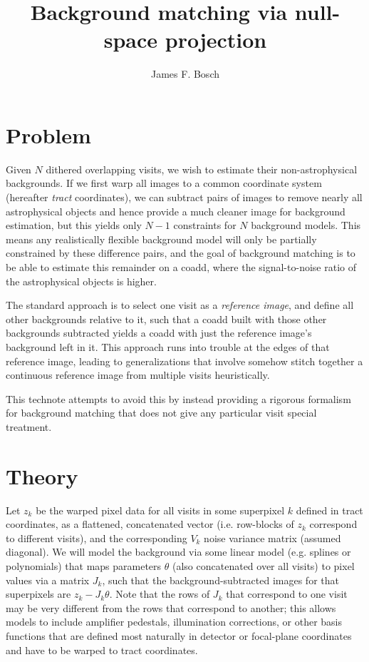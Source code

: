 \documentclass[DM,lsstdraft,authoryear,toc]{lsstdoc}
\title{Background matching via null-space projection}
\author{James F. Bosch}
\date{\vcsDate}
\begin{document}
\mkshorttitle

\section{Problem}

Given $N$ dithered overlapping visits, we wish to estimate their non-astrophysical backgrounds.
If we first warp all images to a common coordinate system (hereafter \emph{tract} coordinates), we can subtract pairs of images to remove nearly all astrophysical objects and hence provide a much cleaner image for background estimation, but this yields only $N-1$ constraints for $N$ background models.
This means any realistically flexible background model will only be partially constrained by these difference pairs, and the goal of background matching is to be able to estimate this remainder on a coadd, where the signal-to-noise ratio of the astrophysical objects is higher.

The standard approach is to select one visit as a \emph{reference image}, and define all other backgrounds relative to it, such that a coadd built with those other backgrounds subtracted yields a coadd with just the reference image's background left in it.
This approach runs into trouble at the edges of that reference image, leading to generalizations that involve somehow stitch together a continuous reference image from multiple visits heuristically.

This technote attempts to avoid this by instead providing a rigorous formalism for background matching that does not give any particular visit special treatment.

\section{Theory}

Let $z_k$ be the warped pixel data for all visits in some superpixel $k$ defined in tract coordinates, as a flattened, concatenated vector (i.e. row-blocks of $z_k$ correspond to different visits), and the corresponding $V_k$ noise variance matrix (assumed diagonal).
We will model the background via some linear model (e.g. splines or polynomials) that maps parameters $\theta$ (also concatenated over all visits) to pixel values via a matrix $J_k$, such that the background-subtracted images for that superpixels are $z_k - J_k\theta$.
Note that the rows of $J_k$ that correspond to one visit may be very different from the rows that correspond to another; this allows models to include amplifier pedestals, illumination corrections, or other basis functions that are defined most naturally in detector or focal-plane coordinates and have to be warped to tract coordinates.
\end{document}
